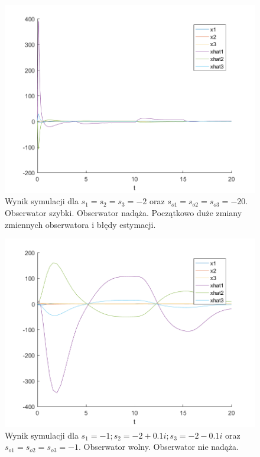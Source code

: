\documentclass{article}
\begin{document}
\begin{figure}[H]
\centering
\includegraphics[width=0.9\linewidth]{z8_-20}
\caption{Wynik symulacji dla $s_1 = s_2 = s_3 = -2$ oraz $s_{o1}=s_{o2}=s_{o3} = -20$. Obserwator szybki. Obserwator nadąża. Początkowo duże zmiany zmiennych obserwatora i błędy estymacji.}
\label{fig:z8_-20}
\end{figure}

\begin{figure}[H]
\centering
\includegraphics[width=0.9\linewidth]{z8_-1}
\caption{Wynik symulacji dla $s_1 = -1; s_2 = -2 + 0.1i; s_3 = -2 -0.1i$ oraz $s_{o1}=s_{o2}=s_{o3} = -1$. Obserwator wolny. Obserwator nie nadąża.}
\label{fig:z8_2-1}
\end{figure}
\end{document}

